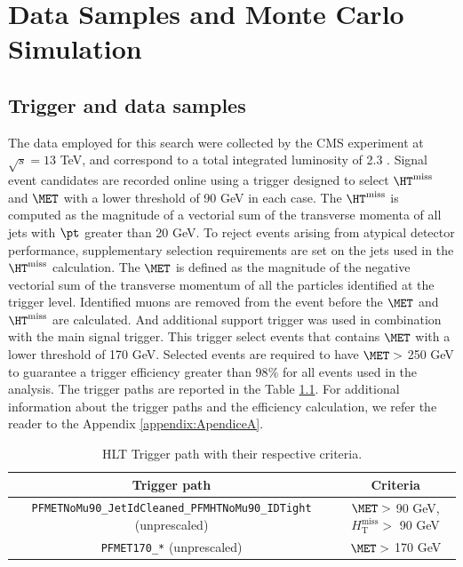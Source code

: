 \chapter{Data Samples and Monte Carlo Simulation}\label{samples}

\section{Trigger and data samples}

\par The data employed for this search were collected by the CMS experiment at $\sqrt{s} = 13$ TeV, and correspond to a total integrated luminosity of 2.3 {\fbinv}.
Signal event candidates are recorded online using a trigger designed to select $\HT^{\text{miss}}$ and $\MET$ with a lower threshold of 90 GeV in each case.
The $\HT^{\text{miss}}$ is computed as the magnitude of a vectorial sum of the transverse momenta of all jets with  $\pt$ greater than 20 GeV.
To reject events arising from atypical detector performance, supplementary selection requirements are set on the jets used in the $\HT^{\text{miss}}$ calculation.
The $\MET$ is defined as the magnitude of the negative vectorial sum of the transverse momentum of all the particles identified at the trigger level.
Identified muons are removed from the event before the $\MET$ and $\HT^{\text{miss}}$ are calculated.
And additional support trigger was used in combination with the main signal trigger. This trigger select events that contains $\MET$ with a lower threshold of 170 GeV. Selected events are required to have $\MET >$ 250 GeV to guarantee a trigger efficiency greater than 98$\%$ for all events used in the analysis. The trigger paths are reported in the Table \ref{tab:triggerPaths}. For additional information about the trigger paths and the efficiency calculation, we refer the reader to the Appendix \ref{appendix:ApendiceA}.

\begin{table}[!ht]
\footnotesize
\begin{center}
\caption{HLT Trigger path with their respective criteria.}
\label{tab:triggerPaths}
\begin{tabular}{cc} \hline
Trigger path & Criteria  \\ \hline
\verb|PFMETNoMu90_JetIdCleaned_PFMHTNoMu90_IDTight| (unprescaled)  &  $\MET>$ 90 GeV, $H_{\text{T}}^{\text{miss}}>$ 90 GeV\\
\verb|PFMET170_*| (unprescaled)  &  $\MET>$ 170 GeV \\ \hline
\end{tabular}
\end{center}
\end{table}

